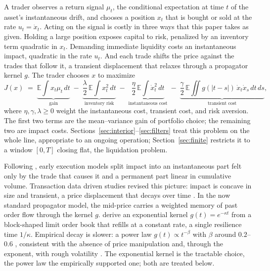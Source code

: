 \documentclass[11pt]{article}
\newcommand{\E}{\mathbb{E}}
\theoremstyle{plain}
\theoremstyle{definition}
\theoremstyle{remark}
\begin{document}
A trader observes a return signal $\mu_t$, the conditional expectation at time $t$ of the asset's instantaneous drift, and chooses a position $x_t$ that is bought or sold at the rate $u_t=\dot x_t$. Acting on the signal is costly in three ways that this paper takes as given. Holding a large position exposes capital to risk, penalized by an inventory term quadratic in $x_t$. Demanding immediate liquidity costs an instantaneous impact, quadratic in the rate $u_t$. And each trade shifts the price against the trades that follow it, a transient displacement that relaxes through a propagator kernel $g$. The trader chooses $x$ to maximize
\begin{equation}\label{eq:objective}
J(x) \;=\;
\underbrace{\E\!\int x_t\mu_t\,dt}_{\text{gain}}
\;-\; \underbrace{\frac{\lambda}{2}\,\E\!\int x_t^2\,dt}_{\text{inventory risk}}
\;-\; \underbrace{\frac{\eta}{2}\,\E\!\int \dot x_t^2\,dt}_{\text{instantaneous cost}}
\;-\; \underbrace{\frac{\gamma}{2}\,\E\!\iint g(|t-s|)\,\dot x_t \dot x_s\,dt\,ds}_{\text{transient cost}} ,
\end{equation}
where $\eta,\gamma,\lambda\ge0$ weight the instantaneous cost, transient cost, and risk aversion. The first two terms are the mean--variance gain of portfolio choice; the remaining two are impact costs. Sections~\ref{sec:interior}--\ref{sec:filters} treat this problem on the whole line, appropriate to an ongoing operation; Section~\ref{sec:finite} restricts it to a window $[0,T]$ closing flat, the liquidation problem.

Following \citet{AlmgrenChriss2001}, early execution models split impact into an instantaneous part felt only by the trade that causes it and a permanent part linear in cumulative volume. Transaction data driven studies revised this picture: impact is concave in size \citep{LilloFarmerMantegna2003} and transient, a price displacement that decays over time \citep{BouchaudGefenPottersWyart2004}. In the now standard propagator model, the mid-price carries a weighted memory of past order flow through the kernel $g$. \citet{ObizhaevaWang2013} derive an exponential kernel $g(t)=e^{-\kappa t}$ from a block-shaped limit order book that refills at a constant rate, a single resilience time $1/\kappa$. Empirical decay is slower: a power law $g(t)\propto t^{-\beta}$ with $\beta$ around $0.2$--$0.6$ \citep{BouchaudGefenPottersWyart2004,JusselinRosenbaum2020}, consistent with the absence of price manipulation \citep{Gatheral2010,AlfonsiSchiedSlynko2012} and, through the exponent, with rough volatility \citep{JusselinRosenbaum2020}. The exponential kernel is the tractable choice, the power law the empirically supported one; both are treated below.
\end{document}
